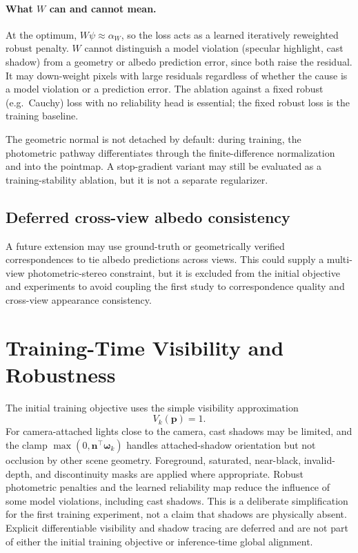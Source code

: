 \documentclass[11pt,a4paper]{article}
\begin{document}
\paragraph{What $W$ can and cannot mean.}
At the optimum, $W\psi\approx\alpha_W$, so the loss acts as a learned
iteratively reweighted robust penalty. $W$ cannot distinguish a model
violation (specular highlight, cast shadow) from a geometry or albedo
prediction error, since both raise the residual. It may down-weight pixels with large residuals regardless of whether the
cause is a model violation or a prediction error. The ablation against a
fixed robust (e.g.\ Cauchy) loss with no reliability head is essential; the
fixed robust loss is the training baseline.

The geometric normal is not detached by default: during training, the
photometric pathway differentiates through the finite-difference
normalization and into the pointmap. A stop-gradient variant may still
be evaluated as a training-stability ablation, but it is not a separate
regularizer.

\subsection{Deferred cross-view albedo consistency}

A future extension may use ground-truth or geometrically verified
correspondences to tie albedo predictions across views. This could supply a
multi-view photometric-stereo constraint, but it is excluded from the
initial objective and experiments to avoid coupling the first study to
correspondence quality and cross-view appearance consistency.
\section{Training-Time Visibility and Robustness}

The initial training objective uses the simple visibility approximation
\[
  V_k(\bm p)=1.
\]
For camera-attached lights close to the camera, cast shadows may be limited,
and the clamp $\max(0,\bm n^\top\bm\omega_k)$ handles attached-shadow
orientation but not occlusion by other scene geometry. Foreground, saturated,
near-black, invalid-depth, and discontinuity masks are applied where
appropriate. Robust photometric penalties and the learned reliability map
reduce the influence of some model violations, including cast shadows.
This is a deliberate simplification for the first training experiment, not
a claim that shadows are physically absent. Explicit differentiable
visibility and shadow tracing are deferred and are not part of either the
initial training objective or inference-time global alignment.
\end{document}
